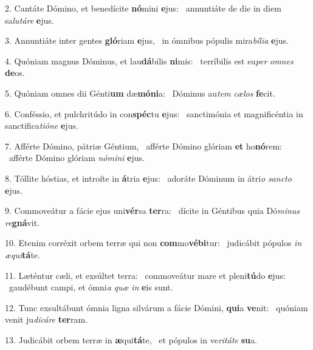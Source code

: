 2. Cantáte Dómino, et benedícite \textbf{nó}mini \textbf{e}jus: \ast\  annuntiáte de die in diem sa\textit{lu}\textit{tá}\textit{re} \textbf{e}jus.\

3. Annuntiáte inter gentes \textbf{gló}riam \textbf{e}jus, \ast\  in ómnibus pópulis mira\textit{bí}\textit{li}\textit{a} \textbf{e}jus.\

4. Quóniam magnus Dóminus, et lau\textbf{dá}bilis \textbf{ni}mis: \ast\  terríbilis est su\textit{per} \textit{om}\textit{nes} \textbf{de}os.\

5. Quóniam omnes dii Génti\textbf{um} dæ\textbf{mó}\textbf{ni}a: \ast\  Dóminus au\textit{tem} \textit{cæ}\textit{los} \textbf{fe}cit.\

6. Conféssio, et pulchritúdo in con\textbf{spéc}tu \textbf{e}jus: \ast\  sanctimónia et magnificéntia in sanctifica\textit{ti}\textit{ó}\textit{ne} \textbf{e}jus.\

7. Afférte Dómino, pátriæ Géntium, \dag\  afférte Dómino glóriam \textbf{et} ho\textbf{nó}rem: \ast\  afférte Dómino glóriam \textit{nó}\textit{mi}\textit{ni} \textbf{e}jus.\

8. Tóllite hóstias, et introíte in \textbf{á}tria \textbf{e}jus: \ast\  adoráte Dóminum in átri\textit{o} \textit{sanc}\textit{to} \textbf{e}jus.\

9. Commoveátur a fácie ejus uni\textbf{vér}sa \textbf{ter}ra: \ast\  dícite in Géntibus quia Dó\textit{mi}\textit{nus} \textit{re}\textbf{gná}vit.\

10. Etenim corréxit orbem terræ qui non \textbf{com}mo\textbf{vé}\textbf{bi}tur: \ast\  judicábit pópulos \textit{in} \textit{æ}\textit{qui}\textbf{tá}te.\

11. Læténtur cæli, et exsúltet terra: \dag\  commoveátur mare et pleni\textbf{tú}do \textbf{e}jus: \ast\  gaudébunt campi, et ómni\textit{a} \textit{quæ} \textit{in} \textbf{e}is sunt.\

12. Tunc exsultábunt ómnia ligna silvárum a fácie Dómini, \textbf{qui}a \textbf{ve}nit: \ast\  quóniam venit ju\textit{di}\textit{cá}\textit{re} \textbf{ter}ram.\

13. Judicábit orbem terræ in \textbf{æ}qui\textbf{tá}te, \ast\  et pópulos in ve\textit{ri}\textit{tá}\textit{te} \textbf{su}a.\


